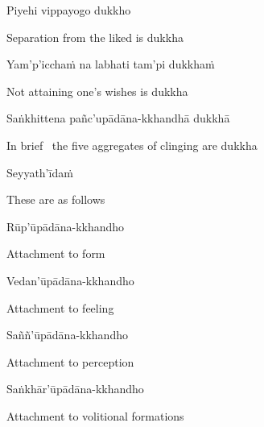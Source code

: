Piyehi vippayogo dukkho

\begin{english}
  Separation from the liked is dukkha
\end{english}

\ifbsixversion\clearpage\fi

Yam'p'icchaṁ na labhati tam'pi dukkhaṁ

\begin{english}
  Not attaining one's wishes is dukkha
\end{english}

\suttaRef{[MN 10]}

Saṅkhittena pañc'upādāna-kkhandhā dukkhā

\begin{english}
  In brief \breathmark\ the five aggregates of clinging are dukkha\ifdigitalversion\makeatletter\hyperlink{endnote15-appendix}\makeatother\fi
\end{english}

Seyyath'īdaṁ

\begin{english}
  These are as follows
\end{english}

Rūp'ūpādāna-kkhandho

\begin{english}
  Attachment to form
\end{english}

Vedan'ūpādāna-kkhandho

\begin{english}
  Attachment to feeling
\end{english}

Saññ'ūpādāna-kkhandho

\begin{english}
  Attachment to perception
\end{english}

Saṅkhār'ūpādāna-kkhandho

\begin{english}
  Attachment to volitional formations\ifdigitalversion\makeatletter\hyperlink{endnote16-appendix}\makeatother\fi
\end{english}

